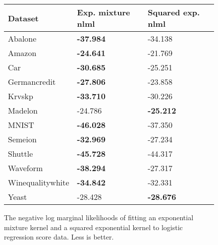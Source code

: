 \documentclass[a4paper,12pt,twoside,openright]{report}
\begin{document}
\begin{figure}
\centering
	\begin{tabular}{|l|l|l|}
\hline
Dataset          & Exp. mixture nlml & Squared exp. nlml \\ \hline\hline
Abalone          & \textbf{-37.984}  & -34.138           \\ \hline
Amazon           & \textbf{-24.641}  & -21.769           \\ \hline
Car              & \textbf{-30.685}  & -25.251           \\ \hline
Germancredit     & \textbf{-27.806}  & -23.858           \\ \hline
Krvskp           & \textbf{-33.710}  & -30.226           \\ \hline
Madelon          & -24.786           & \textbf{-25.212}  \\ \hline
MNIST            & \textbf{-46.028}  & -37.350           \\ \hline
Semeion          & \textbf{-32.969}  & -27.234           \\ \hline
Shuttle          & \textbf{-45.728}  & -44.317           \\ \hline
Waveform         & \textbf{-38.294}  & -27.317           \\ \hline
Winequalitywhite & \textbf{-34.842}  & -32.331           \\ \hline
Yeast            & -28.428           & \textbf{-28.676}  \\ \hline
\end{tabular}

	\caption{The negative log marginal likelihoods of fitting an exponential mixture kernel and a squared exponential kernel to logistic regression score data. Less is better.}
\label{rnd_forest_fits}

\end{figure}
\end{document}
